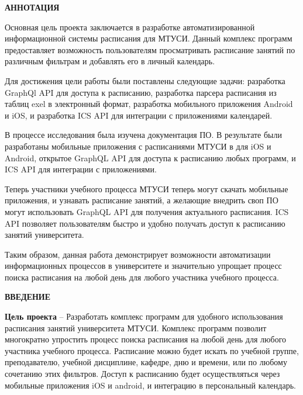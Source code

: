 \newpage
\begin{center}
  \textbf{\large АННОТАЦИЯ}
\end{center}


Основная цель проекта заключается в разработке автоматизированной информационной системы расписания для МТУСИ.
Данный комплекс программ предоставляет возможность пользователям просматривать расписание занятий по различным фильтрам и добавлять его в личный календарь.

Для достижения цели работы были поставлены следующие задачи: разработка GraphQl API для доступа к расписанию,
разработка парсера расписания из таблиц exel в электронный формат, разработка мобильного приложения Android и iOS, и 
разработка ICS API для интеграции с приложениями календарей.

В процессе исследования была изучена документация ПО.
В результате были разработаны мобильные приложения с расписаниями МТУСИ в для iOS и Android,
открытое GraphQL API для доступа к расписанию любых программ, и ICS API для интеграции с приложениями.

Теперь участники учебного процесса МТУСИ теперь могут скачать мобильные приложения, и узнавать расписание занятий, 
а желающие внедрить своп ПО могут использовать GraphQL API для получения актуального расписания.
ICS API позволяет пользователям быстро и удобно получать доступ к расписанию занятий университета.

Таким образом, данная работа демонстрирует возможности автоматизации информационных процессов в университете и
значительно упрощает процесс поиска расписания на любой день для любого участника учебного процесса.

\onehalfspacing
\setcounter{page}{2}

\newpage
\renewcommand{\contentsname}{\centerline{\large СОДЕРЖАНИЕ}}
\tableofcontents

\newpage
\begin{center}
  \textbf{\large ВВЕДЕНИЕ}
\end{center}


\textbf{Цель проекта} -- Разработать комплекс программ для удобного использования расписания занятий университета МТУСИ.
Комплекс программ позволит многократно упростить процесс поиска расписания на любой день для любого участника учебного процесса.
Расписание можно будет искать по учебной группе, преподавателю, учебной дисциплине, кафедре, дню и времени,
или по любому сочетанию этих фильтров.
Доступ к расписанию будет осуществляться через мобильные приложения iOS и android, и интеграцию в персональный календарь.

